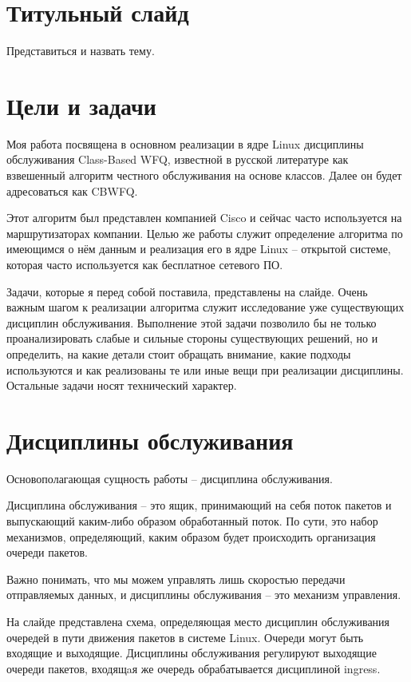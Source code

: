 \documentclass[12pt]{ncc}
\begin{document}
	\section{Титульный слайд}
		Представиться и назвать тему.

	\section{Цели и задачи}
		Моя работа посвящена в основном реализации в ядре Linux
	    дисциплины обслуживания  Class-Based WFQ, известной
		в русской литературе как
		взвешенный алгоритм честного обслуживания на основе классов.
		Далее он будет адресоваться как CBWFQ.

		Этот алгоритм был представлен компанией Cisco и сейчас
		часто используется на маршрутизаторах компании. Целью
		же работы служит определение алгоритма по имеющимся о
		нём данным и реализация его в ядре Linux -- открытой
		системе, которая часто используется как бесплатное
		сетевого ПО.

		Задачи, которые я перед собой поставила, представлены на слайде.
		Очень важным шагом к реализации алгоритма служит исследование
		уже существующих дисциплин обслуживания. Выполнение этой 
		задачи позволило бы не только проанализировать
		слабые и сильные стороны существующих решений, но и
		определить, на какие детали стоит обращать внимание,
		какие подходы используются и как реализованы те или
		иные вещи при реализации дисциплины.
		Остальные задачи носят технический характер.

	\section{Дисциплины обслуживания}

	Основополагающая сущность работы -- дисциплина обслуживания.
	
	Дисциплина обслуживания -- это ящик, принимающий на себя поток пакетов
	и выпускающий каким-либо образом обработанный поток. По сути,
	это набор механизмов, определяющий, каким образом будет 
	происходить организация очереди пакетов. 

    Важно понимать, что мы можем управлять лишь скоростью передачи
    отправляемых данных, и дисциплины обслуживания -- это механизм
	управления.

	На слайде представлена схема, определяющая место дисциплин обслуживания
	очередей в пути движения пакетов в системе Linux. Очереди могут
	быть входящие и выходящие. Дисциплины обслуживания регулируют
	выходящие очереди пакетов, входящaя же очередь обрабатывается
	дисциплиной ingress.
\end{document}

